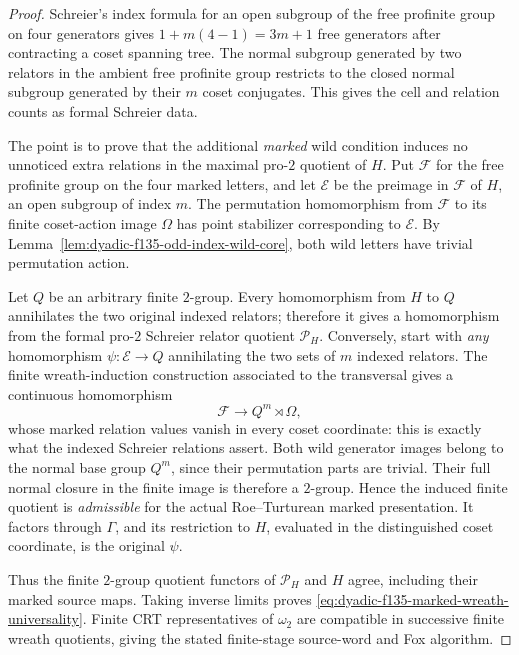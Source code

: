 \begin{proof}
Schreier's index
formula for an open
subgroup of the free
profinite group
on four generators
gives $1+m(4-1)=3m+1$
free generators after
contracting a coset
spanning tree.
The normal subgroup
generated by two
relators in the
ambient free profinite
group restricts to
the closed normal
subgroup generated
by their $m$ coset
conjugates.
This gives the cell
and relation counts
as formal Schreier
data.

The point is to
prove that the
additional \emph{marked}
wild condition induces
no unnoticed extra
relations in the
maximal pro-$2$
quotient of $H$.
Put $\mathcal F$ for the
free profinite group on
the four marked
letters, and let
$\mathcal E$ be the
preimage in $\mathcal F$
of $H$, an open
subgroup of index $m$.
The permutation
homomorphism from
$\mathcal F$ to its
finite coset-action
image $\Omega$ has
point stabilizer
corresponding to
$\mathcal E$.
By
Lemma~\ref{lem:dyadic-f135-odd-index-wild-core},
both wild letters
have trivial
permutation action.

Let $Q$ be an
arbitrary finite
$2$-group.
Every homomorphism
from $H$ to $Q$
annihilates the
two original
indexed relators;
therefore it gives
a homomorphism from
the formal pro-$2$
Schreier relator
quotient $\mathscr P_H$.
Conversely, start
with \emph{any}
homomorphism
$\psi:\mathcal E\to Q$
annihilating the
two sets of $m$
indexed relators.
The finite
wreath-induction
construction
associated to
the transversal
gives a continuous
homomorphism
\begin{equation}\label{eq:dyadic-f135-wreath-extension}
\mathcal F\longrightarrow
Q^m\rtimes\Omega,
\end{equation}
whose marked
relation values
vanish in every
coset coordinate:
this is exactly
what the indexed
Schreier relations
assert.
Both wild
generator images
belong to the
normal base group
$Q^m$, since
their permutation
parts are trivial.
Their full normal
closure in the
finite image is
therefore a
$2$-group.
Hence the induced
finite quotient is
\emph{admissible}
for the actual
Roe--Turturean
marked presentation.
It factors through
$\Gamma$, and its
restriction to $H$,
evaluated in the
distinguished coset
coordinate, is
the original $\psi$.

Thus the finite
$2$-group quotient
functors of
$\mathscr P_H$
and $H$ agree,
including their
marked source
maps.  Taking
inverse limits
proves
\eqref{eq:dyadic-f135-marked-wreath-universality}.
Finite CRT
representatives
of $\omega_2$
are compatible
in successive
finite wreath
quotients, giving
the stated
finite-stage
source-word and
Fox algorithm.
\end{proof}

